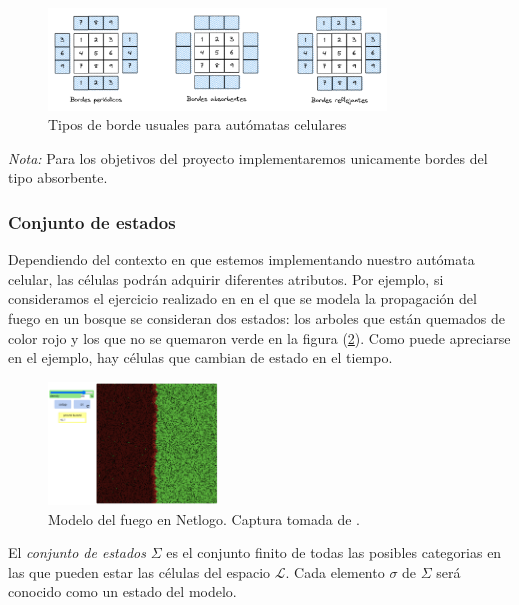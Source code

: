 \begin{figure}[h]
  \centering
    \includegraphics[width=0.8\textwidth]{Imagenes/Tipos_de_borde.PNG}
  \caption{Tipos de borde usuales para autómatas celulares}
  \label{fig:Tipos de borde}
\end{figure}
    
\textit{Nota:} Para los objetivos del proyecto implementaremos unicamente bordes del tipo absorbente.

\subsubsection{Conjunto de estados}

Dependiendo del contexto en que estemos implementando nuestro autómata celular, las células podrán adquirir diferentes atributos. Por ejemplo, si consideramos el ejercicio realizado en  \cite{NetLogoFireModel} en el que se modela la propagación del fuego en un bosque se consideran dos estados: los arboles que están quemados de color rojo y los que no se quemaron verde en la figura (\ref{fig:Fuego Netlogo}). Como puede apreciarse en el ejemplo, hay células que cambian de estado en el tiempo.

\begin{figure}[h]
  \centering
    \includegraphics[width=0.4\textwidth]{Imagenes/netlogoEx1.PNG}
  \caption{Modelo del fuego en Netlogo. Captura tomada de \cite{NetLogoFireModel}.}
  \label{fig:Fuego Netlogo}
\end{figure}

\begin{definition}\label{conjuntoDeEstados}
El \textit{conjunto de estados} $\Sigma$ es el conjunto finito de todas las posibles categorias en las que pueden estar las células del espacio $\mathcal{L}$. Cada elemento $\sigma$ de $\Sigma$ será conocido como un estado del modelo.
\end{definition}

